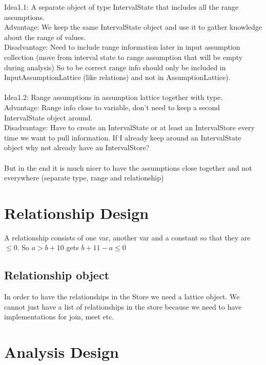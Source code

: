 \documentclass[11pt]{article}
\begin{document}
Idea1.1: A separate object of type IntervalState that includes all the range assumptions.\\
Advantage: We keep the same IntervalState object and use it to gather knowledge about the range of values.\\
Disadvantage: Need to include range information later in input assumption collection (move from interval state to range assumption that will be empty during analysis) So to be correct range info should only be included in InputAssumptionLattice (like relations) and not in AssumptionLattice). \\
\\
Idea1.2: Range assumptions in assumption lattice together with type.\\
Advantage: Range info close to variable, don't need to keep a second IntervalState object around.\\
Disadvantage: Have to create an IntervalState or at least an IntervalStore every time we want to pull information. If I already keep around an IntervalState object why not already have an IntervalStore?\\
\\
But in the end it is much nicer to have the assumptions close together and not everywhere (separate type, range and relationship)\\

\section{Relationship Design}

A relationship consists of one var, another var and a constant so that they are $\leq 0$. So $a > b + 10$ gets $b + 11 - a \leq 0$\\

\subsection{Relationship object}

In order to have the relationships in the Store we need a lattice object. We cannot just have a list of relationships in the store because we need to have implementations for join, meet etc.\\


\section{Analysis Design}
\end{document}
